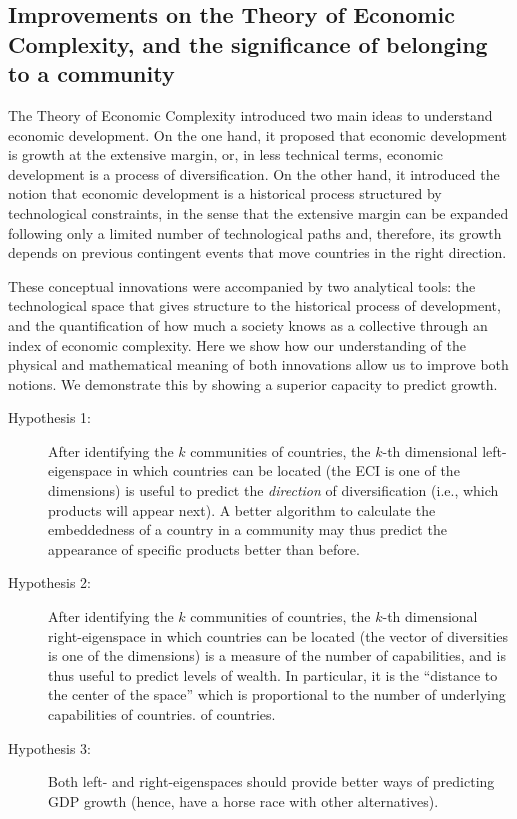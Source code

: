 \documentclass{pnastwo}
\begin{document}
\begin{article}
\section{Improvements on the Theory of Economic Complexity, and the significance of belonging to a community}
\label{sec:whycommunities}
The Theory of Economic Complexity introduced two main ideas to understand economic development. On the one hand, it proposed that economic development is growth at the extensive margin, or, in less technical terms, economic development is a process of diversification. On the other hand, it introduced the notion that economic development is a historical process structured by technological constraints, in the sense that the extensive margin can be expanded following only a limited number of technological paths and, therefore, its growth depends on previous contingent events that move countries in the right direction. 

These conceptual innovations were accompanied by two analytical tools: the technological space that gives structure to the historical process of development, and the quantification of how much a society knows as a collective through an index of economic complexity. Here we show how our understanding of the physical and mathematical meaning of both innovations allow us to improve both notions. We demonstrate this by showing a superior capacity to predict growth.

\begin{description}
    \item[Hypothesis 1:] After identifying the $k$ communities of countries, the $k$-th dimensional left-eigenspace in which countries can be located (the ECI is one of the dimensions) is useful to predict the \emph{direction} of diversification (i.e., which products will appear next). A better algorithm to calculate the embeddedness of a country in a community may thus predict the appearance of specific products better than before. 
    \item[Hypothesis 2:] After identifying the $k$ communities of countries, the $k$-th dimensional right-eigenspace in which countries can be located (the vector of diversities is one of the dimensions) is a measure of the number of capabilities, and is thus useful to predict levels of wealth. In particular, it is the ``distance to the center of the space'' which is proportional to the number of underlying capabilities of countries. of countries. 
    \item[Hypothesis 3:] Both left- and right-eigenspaces should provide better ways of predicting GDP growth (hence, have a horse race with other alternatives).
\end{description}


\end{article}
\end{document}
